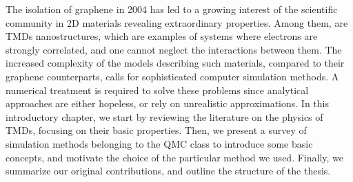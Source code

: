 
\label{cap:int}

\slshape

The isolation of graphene in 2004 has led to a growing interest of the scientific community in \ac{2D} materials revealing extraordinary properties.
Among them, are \acp{TMD} nanostructures, which are examples of systems where electrons are strongly correlated, and one cannot neglect the interactions between them.
The increased complexity of the models describing such materials, compared to their graphene counterparts, calls for sophisticated computer simulation methods.
A numerical treatment is required to solve these problems since analytical approaches are either hopeless, or rely on unrealistic approximations.
In this introductory chapter, we start by  reviewing the literature on the physics of \acp{TMD}, focusing on their basic properties.
Then, we present a survey of simulation methods belonging to the \acl{QMC} class to introduce some basic concepts, and motivate the choice of the particular method we used.
Finally, we summarize our original contributions, and outline the structure of the thesis.

\normalfont








\cleardoublepage